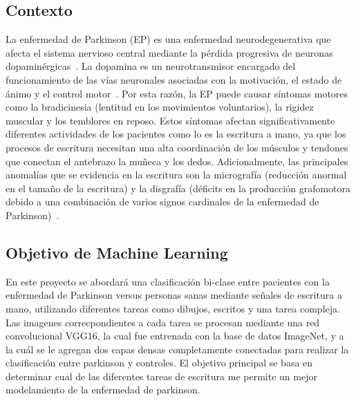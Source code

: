 \documentclass[10pt, a4paper]{article}
\begin{document}
\newpage

\subsection*{Contexto}

La enfermedad de Parkinson (EP) es una enfermedad neurodegenerativa que afecta 
el sistema nervioso central mediante la pérdida progresiva de neuronas 
dopaminérgicas~\cite{ref1}. La dopamina es un neurotransmisor encargado del 
funcionamiento de las vías neuronales asociadas con la motivación, el estado de 
ánimo y el control motor~\cite{ref2}. Por esta razón, la EP puede causar síntomas 
motores como la bradicinesia (lentitud en los movimientos voluntarios), la rigidez 
muscular y los temblores en reposo. Estos síntomas afectan significativamente 
diferentes actividades de los pacientes como lo es la escritura a mano, ya que los 
procesos de escritura necesitan una alta coordinación de los músculos y tendones 
que conectan el antebrazo la muñeca y los dedos. Adicionalmente, las principales 
anomalías que se evidencia en la escritura son la micrografía (reducción anormal en 
el tamaño de la escritura) y la disgrafía (déficits en la producción grafomotora 
debido a una combinación de varios signos cardinales de la enfermedad de Parkinson)~\cite{ref32}.


\subsection*{Objetivo de Machine Learning}

En este proyecto se abordará una clasificación bi-clase entre pacientes con la enfermedad de Parkinson 
versus personas sanas mediante señales de escritura a mano, utilizando diferentes tareas como dibujos, 
escritos y una tarea compleja. Las imagenes correcpondientes a cada tarea se procesan mediante una red 
convolucional VGG16, la cual fue entrenada con la base de datos ImageNet, y a la cuál se le agregan dos 
capas densas completamente conectadas para realizar la clasificación entre parkinson y controles.
El objetivo principal se basa en determinar cual de las diferentes tareas de escritura me permite un mejor
modelamiento de la enfermedad de parkinson. 
\end{document}
